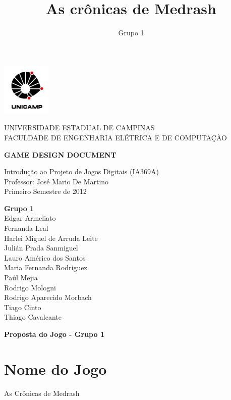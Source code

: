 \documentclass[letterpaper,11pt]{article}
\title{ As cr\^{o}nicas de Medrash }
\author{ Grupo 1 }
\date{}
\begin{document}
\begin{center}
\begin{minipage}{2.4 cm}
\begin{center}
\includegraphics{logo.png}
\end{center}
\end{minipage}
\begin{minipage}{12 cm}
\begin{center}
\Large
UNIVERSIDADE ESTADUAL DE CAMPINAS \\
FACULDADE DE ENGENHARIA ELÉTRICA E DE COMPUTAÇÃO
\end{center}
\end{minipage}
\end{center}

\vspace{6 cm}
\begin{center}
{\bf \large GAME DESIGN DOCUMENT}
\vspace{0.5 cm}

Introdução ao Projeto de Jogos Digitais (IA369A) \\
Professor: José Mario De Martino \\
Primeiro Semestre de 2012
\end{center}
\vspace{3 cm}
\begin{flushright}
{\bf Grupo 1} \\
Edgar Armeliato \\
Fernanda Leal \\
Harlei Miguel de Arruda Leite \\
Julián Prada Sanmiguel \\
Lauro Américo dos Santos \\
Maria Fernanda Rodriguez \\
Paúl Mejia \\
Rodrigo Mologni \\
Rodrigo Aparecido Morbach \\
Tiago Cinto \\
Thiago Cavalcante
\end{flushright}

\newpage
\tableofcontents
\newpage

{\bf Proposta do Jogo - Grupo 1}

\section{Nome do Jogo}

As Crônicas de Medrash













\end{document}
